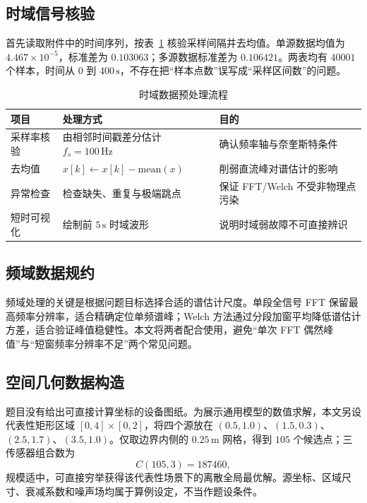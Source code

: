 \documentclass[withoutpreface,bwprint]{cumcmthesis}
\begin{document}
\subsection{时域信号核验}

首先读取附件中的时间序列，按表~\ref{tab:preprocess} 核验采样间隔并去均值。单源数据均值为 \(4.467\times10^{-5}\)，标准差为 \(0.103063\)；多源数据标准差为 \(0.106421\)。两表均有 \(40001\) 个样本，时间从 \(0\) 到 \(400\,\mathrm{s}\)，不存在把“样本点数”误写成“采样区间数”的问题。

\begin{table}[H]
\centering
\small
\setlength{\tabcolsep}{3pt}
\renewcommand{\arraystretch}{1.05}
\caption{时域数据预处理流程}
\label{tab:preprocess}
\begin{tabular}{>{\centering\arraybackslash}m{2.5cm} m{6.1cm} m{5.1cm}}
\toprule
项目 & 处理方式 & 目的 \\
\midrule
采样率核验 & 由相邻时间戳差分估计 \(f_s=100\,\mathrm{Hz}\) & 确认频率轴与奈奎斯特条件 \\
去均值 & \(x[k]\leftarrow x[k]-\mathrm{mean}(x)\) & 削弱直流峰对谱估计的影响 \\
异常检查 & 检查缺失、重复与极端跳点 & 保证 FFT/Welch 不受非物理点污染 \\
短时可视化 & 绘制前 \(5\,\mathrm{s}\) 时域波形 & 说明时域弱故障不可直接辨识 \\
\bottomrule
\end{tabular}
\end{table}

\subsection{频域数据规约}

频域处理的关键是根据问题目标选择合适的谱估计尺度\cite{proakis2006,bendat2010}。单段全信号 FFT 保留最高频率分辨率，适合精确定位单频谱峰；Welch 方法通过分段加窗平均降低谱估计方差，适合验证峰值稳健性。本文将两者配合使用，避免“单次 FFT 偶然峰值”与“短窗频率分辨率不足”两个常见问题。

\subsection{空间几何数据构造}

题目没有给出可直接计算坐标的设备图纸。为展示通用模型的数值求解，本文另设代表性矩形区域 \([0,4]\times[0,2]\)，将四个源放在 \((0.5,1.0)\)、\((1.5,0.3)\)、\((2.5,1.7)\)、\((3.5,1.0)\)。仅取边界内侧的 \(0.25\,\mathrm{m}\) 网格，得到 \(105\) 个候选点；三传感器组合数为
\[
    C(105,3)=187460,
\]
规模适中，可直接穷举获得该代表性场景下的离散全局最优解。源坐标、区域尺寸、衰减系数和噪声场均属于算例设定，不当作题设条件。
\end{document}
